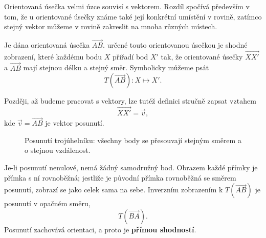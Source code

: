 \documentclass[12pt,a4paper]{article}
\begin{document}
\begin{notebox}
    Orientovaná úsečka velmi úzce souvisí s vektorem. Rozdíl spočívá především v tom, že u orientované úsečky známe také její konkrétní umístění v rovině, zatímco stejný vektor můžeme v rovině zakreslit na mnoha různých místech.
\end{notebox}

\begin{definitionbox}
    Je dána orientovaná úsečka $\overrightarrow{AB}$.  určené touto orientovanou úsečkou je shodné zobrazení, které každému bodu $X$ přiřadí bod $X'$ tak, že orientované úsečky $\overrightarrow{XX'}$ a $\overrightarrow{AB}$ mají stejnou délku a stejný směr. Symbolicky můžeme psát
    \[
        T(\overrightarrow{AB}) : X\mapsto X'.
    \]
\end{definitionbox}

Později, až budeme pracovat s vektory, lze tutéž definici stručně zapsat vztahem
\[
    \overrightarrow{XX'}=\vec v,
\]
kde $\vec v=\overrightarrow{AB}$ je vektor posunutí.

\begin{figure}[ht]
    \centering
    \caption{Posunutí trojúhelníku: všechny body se přesouvají stejným směrem a o stejnou vzdálenost.}
\end{figure}

Je-li posunutí nenulové, nemá žádný samodružný bod. Obrazem každé přímky je přímka s ní rovnoběžná; jestliže je původní přímka rovnoběžná se směrem posunutí, zobrazí se jako celek sama na sebe. Inverzním zobrazením k $T(\overrightarrow{AB})$ je posunutí v opačném směru,
\[
    T(\overrightarrow{BA}).
\]
Posunutí zachovává orientaci, a proto je \textbf{přímou shodností}.
\end{document}
